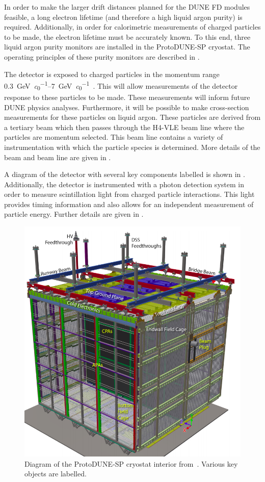 In order to make the larger drift distances planned for the DUNE FD modules feasible, a long electron lifetime (and therefore a high liquid argon purity) is required.
Additionally, in order for calorimetric measurements of charged particles to be made, the electron lifetime must be accurately known.
To this end, three liquid argon purity monitors are installed in the ProtoDUNE-SP cryostat.
The operating principles of these purity monitors are described in .

The detector is exposed to charged particles in the momentum range \SIrange{0.3}{7}{\GeV\per\clight}~\cite{protodunePerformance}.
This will allow measurements of the detector response to these particles to be made.
These measurements will inform future DUNE physics analyses.
Furthermore, it will be possible to make cross-section measurements for these particles on liquid argon.
These particles are derived from a tertiary beam which then passes through the H4-VLE beam line where the particles are momentum selected.
This beam line contains a variety of instrumentation with which the particle species is determined.
More details of the beam and beam line are given in .

A diagram of the detector with several key components labelled is shown in .
Additionally, the detector is instrumented with a photon detection system in order to measure scintillation light from charged particle interactions. 
This light provides timing information and also allows for an independent measurement of particle energy.
Further details are given in .

\begin{figure}[h]
	\centering
	\includegraphics[width=.6\linewidth]{files/figures/protodune_detector/pdspDiag}
	\caption[Captioned diagram of the ProtoDUNE-SP cryostat interior]{Diagram of the ProtoDUNE-SP cryostat interior from~\cite{protodunePerformance}. Various key objects are labelled.}
	\label{fig:pdspDiag}
\end{figure}

